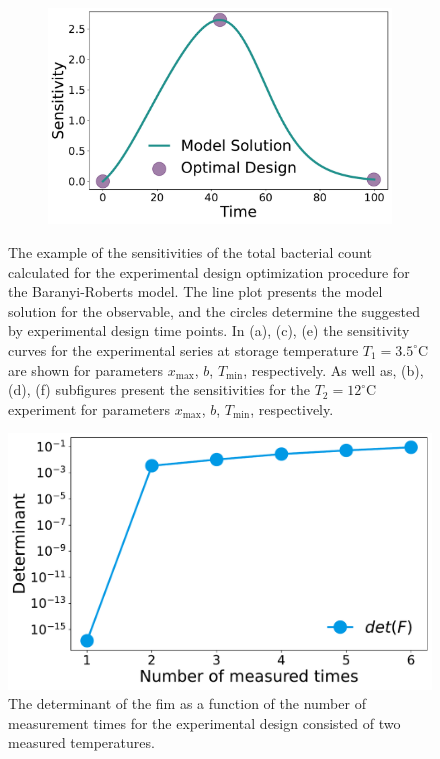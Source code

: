 \documentclass[graybox]{svmult}
\begin{document}
\begin{figure}[H]
\begin{subfigure}{.5\textwidth}
    \end{subfigure}
    \begin{subfigure}{.5\textwidth}
          \centering
          \includegraphics[scale=0.25]{Figures/Fig7f.pdf}
        \end{subfigure}
    \caption{{\footnotesize The example of the sensitivities of the total bacterial count calculated for the experimental design optimization procedure for the Baranyi-Roberts model.
    The line plot presents the model solution for the observable, and the circles determine the suggested by experimental design time points.
    In (a), (c), (e) the sensitivity curves for the experimental series at storage temperature $T_1=3.5^\circ$C are shown for parameters $x_\text{max}$, $b$, $T_\text{min}$, respectively.
    As well as, (b), (d), (f) subfigures present the sensitivities for the $T_2=12^\circ$C experiment for parameters $x_\text{max}$, $b$, $T_\text{min}$, respectively.}}
    \label{Fig7}
\end{figure}
%
%
\begin{figure}[H]
    \centering
    \includegraphics[scale=0.3]{Figures/Fig8.pdf}
    \caption{The determinant of the \ac{fim} as a function of the number of measurement times for the experimental design consisted of two measured temperatures.}
    \label{Fig8}
\end{figure}
\end{document}

